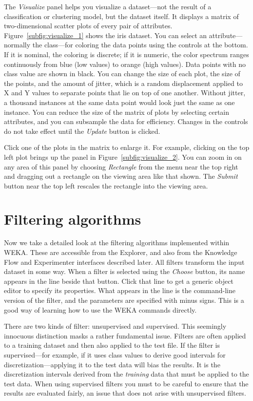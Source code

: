 The \textit{Visualize} panel helps you visualize a dataset---not the
result of a classification or clustering model, but the dataset
itself. It displays a matrix of two-dimensional scatter plots of every
pair of attributes. Figure~\ref{subfig:visualize_1} shows the iris dataset. You can
select an attribute---normally the class---for coloring the data
points using the controls at the bottom. If it is nominal, the
coloring is discrete; if it is numeric, the color spectrum ranges
continuously from blue (low values) to orange (high values). Data
points with no class value are shown in black. You can change the size
of each plot, the size of the points, and the amount of jitter, which
is a random displacement applied to X and Y values to separate points
that lie on top of one another. Without jitter, a thousand instances
at the same data point would look just the same as one instance. You
can reduce the size of the matrix of plots by selecting certain
attributes, and you can subsample the data for efficiency. Changes in
the controls do not take effect until the \textit{Update} button is
clicked.

Click one of the plots in the matrix to enlarge it. For example,
clicking on the top left plot brings up the panel in
Figure~\ref{subfig:visualize_2}. You can zoom in on any area of this
panel by choosing \textit{Rectangle} from the menu near the top right
and dragging out a rectangle on the viewing area like that shown. The
\textit{Submit} button near the top left rescales the rectangle into
the viewing area.

\section{Filtering algorithms}

Now we take a detailed look at the filtering algorithms implemented
within WEKA. These are accessible from the Explorer, and also from the
Knowledge Flow and Experimenter interfaces described later. All
filters transform the input dataset in some way. When a filter is
selected using the \textit{Choose} button, its name appears in the line beside
that button. Click that line to get a generic object editor to specify
its properties. What appears in the line is the command-line version
of the filter, and the parameters are specified with minus signs. This
is a good way of learning how to use the WEKA commands directly.

There are two kinds of filter: unsupervised and supervised. This
seemingly innocuous distinction masks a rather fundamental
issue. Filters are often applied to a training dataset and then also
applied to the test file. If the filter is supervised---for example,
if it uses class values to derive good intervals for
discretization---applying it to the test data will bias the
results. It is the discretization intervals derived from the
\textit{training} data that must be applied to the test data. When
using supervised filters you must to be careful to ensure that the
results are evaluated fairly, an issue that does not arise with
unsupervised filters.  

